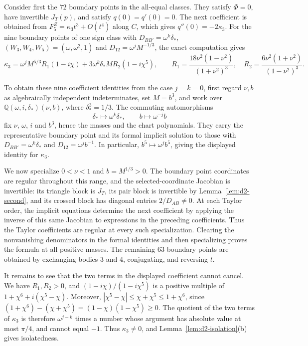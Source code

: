 \documentclass[Threeside,11pt]{article}
\theoremstyle{definition}
\theoremstyle{remark}
\numberwithin{equation}{section}
\theoremstyle{remark}
\begin{document}
{Consider first the $72$ boundary points in the all-equal classes.
They satisfy $\Phi=0$, have invertible $J_T(p)$, and satisfy $q(0)=q'(0)=0$.
The next coefficient is obtained from $F^Z_5=\kappa_3t^3+O(t^4)$ along $C$, which gives
$q''(0)=-2\kappa_3$.
For the nine boundary points of one sign class with $D_{BB'}=\omega^k\delta_*$,
$(W_3,W_4,W_5)=(\omega,\omega^2,1)$ and $D_{12}=\omega^jM^{-1/3}$, the exact computation gives}
\[
  \kappa_3=\omega^jM^{5/3}R_1(1-i\chi)+3\omega^k\delta_*MR_2(1-i\chi^5),\qquad
  R_1=\frac{18\nu^2(1-\nu^2)}{(1+\nu^2)^3},\quad R_2=\frac{6\nu^2(1+\nu^2)}{(1-\nu^2)^3}.
\]
{To obtain these nine coefficient identities from the case $j=k=0$, first regard
$\nu,b$ as algebraically independent indeterminates, set $M=b^3$, and work over
$\mathbb Q(\omega,i,\delta_*)(\nu,b)$, where $\delta_*^3=1/3$.
The commuting automorphisms
\[
  \delta_*\mapsto\omega^k\delta_*,\qquad b\mapsto\omega^{-j}b
\]
fix $\nu$, $\omega$, $i$ and $b^3$, hence the masses and the chart polynomials.
They carry the representative boundary point and its formal implicit solution to those with
$D_{BB'}=\omega^k\delta_*$ and $D_{12}=\omega^jb^{-1}$.
In particular, $b^5\mapsto\omega^jb^5$, giving the displayed identity for $\kappa_3$.

We now specialize $0<\nu<1$ and $b=M^{1/3}>0$.
The boundary point coordinates are regular throughout this range, and the selected-coordinate
Jacobian is invertible: its triangle block is $J_T$, its pair block is invertible by
Lemma~\ref{lem:d2-second}, and its crossed block has diagonal entries $2/D_{AB}\ne0$.
At each Taylor order, the implicit equations determine the next coefficient by applying
the inverse of this same Jacobian to expressions in the preceding coefficients.
Thus the Taylor coefficients are regular at every such specialization.
Clearing the nonvanishing denominators in the formal identities and then specializing
proves the formula at all positive masses.
The remaining $63$ boundary points are obtained by exchanging bodies $3$ and $4$, conjugating,
and reversing $t$.

It remains to see that the two terms in the displayed coefficient cannot cancel.
We have $R_1,R_2>0$, and $(1-i\chi)/(1-i\chi^5)$ is a positive multiple of
$1+\chi^6+i(\chi^5-\chi)$.
Moreover, $|\chi^5-\chi|\le\chi+\chi^5\le1+\chi^6$, since
$(1+\chi^6)-(\chi+\chi^5)=(1-\chi)(1-\chi^5)\ge0$.
The quotient of the two terms of $\kappa_3$ is therefore $\omega^{j-k}$ times a number
whose argument has absolute value at most $\pi/4$, and cannot equal $-1$.
Thus $\kappa_3\ne0$, and Lemma~\ref{lem:d2-isolation}(b) gives isolatedness.}
\end{document}
